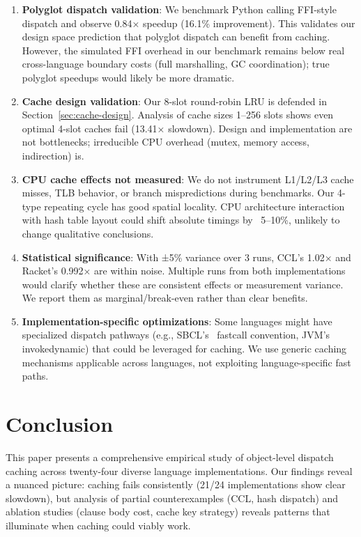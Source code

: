 \documentclass[sigplan,final,acmsmall,review,screen]{acmart}
\begin{document}
\begin{enumerate}
  \item \textbf{Polyglot dispatch validation}: We benchmark Python calling FFI-style dispatch and observe 0.84× speedup (16.1\% improvement).
    This validates our design space prediction that polyglot dispatch can benefit from caching. However, the simulated FFI overhead in our benchmark remains below real cross-language boundary costs (full marshalling, GC coordination); true polyglot speedups would likely be more dramatic.

  \item \textbf{Cache design validation}: Our 8-slot round-robin LRU is defended in Section~\ref{sec:cache-design}.
    Analysis of cache sizes 1--256 slots shows even optimal 4-slot caches fail (13.41× slowdown). Design and
    implementation are not bottlenecks; irreducible CPU overhead (mutex, memory access, indirection) is.

  \item \textbf{CPU cache effects not measured}: We do not instrument L1/L2/L3 cache misses, TLB behavior, or branch
    mispredictions during benchmarks. Our 4-type repeating cycle has good spatial locality. CPU architecture interaction
    with hash table layout could shift absolute timings by ~5--10\%, unlikely to change qualitative conclusions.

  \item \textbf{Statistical significance}: With ±5\% variance over 3 runs, CCL's 1.02× and Racket's 0.992× are within noise.
    Multiple runs from both implementations would clarify whether these are consistent effects or measurement variance.
    We report them as marginal/break-even rather than clear benefits.

  \item \textbf{Implementation-specific optimizations}: Some languages might have specialized dispatch pathways
    (e.g., SBCL's ~fastcall convention, JVM's invokedynamic) that could be leveraged for caching. We use generic
    caching mechanisms applicable across languages, not exploiting language-specific fast paths.
\end{enumerate}

\section{Conclusion}

This paper presents a comprehensive empirical study of object-level dispatch caching across twenty-four diverse language implementations.
Our findings reveal a nuanced picture: caching fails consistently (21/24 implementations show clear slowdown), but analysis of partial
counterexamples (CCL, hash dispatch) and ablation studies (clause body cost, cache key strategy) reveals patterns that illuminate
when caching could viably work.
\end{document}
